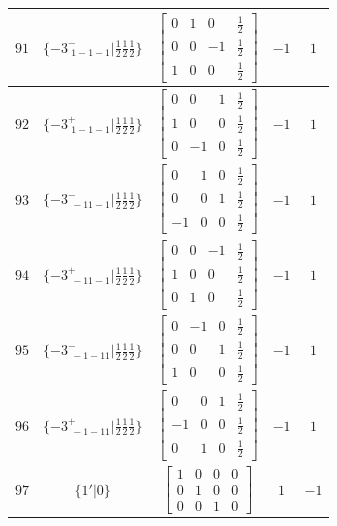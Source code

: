 \documentclass[fleqn,8pt]{jsarticle}
\begin{document}
\begin{longtable}{ccccc}
$ 91 $ & $ \{-3^{-}_{\,\,1-1-1}|\frac{1}{2} \frac{1}{2} \frac{1}{2}\} $ & $ \begin{bmatrix} 0 & 1 & 0 & \frac{1}{2} \\ 0 & 0 & -1 & \frac{1}{2} \\ 1 & 0 & 0 & \frac{1}{2} \end{bmatrix} $ & $ -1 $ & $ 1 $ \\ \hline
$ 92 $ & $ \{-3^{+}_{\,\,1-1-1}|\frac{1}{2} \frac{1}{2} \frac{1}{2}\} $ & $ \begin{bmatrix} 0 & 0 & 1 & \frac{1}{2} \\ 1 & 0 & 0 & \frac{1}{2} \\ 0 & -1 & 0 & \frac{1}{2} \end{bmatrix} $ & $ -1 $ & $ 1 $ \\ \hline
$ 93 $ & $ \{-3^{-}_{\,\,-11-1}|\frac{1}{2} \frac{1}{2} \frac{1}{2}\} $ & $ \begin{bmatrix} 0 & 1 & 0 & \frac{1}{2} \\ 0 & 0 & 1 & \frac{1}{2} \\ -1 & 0 & 0 & \frac{1}{2} \end{bmatrix} $ & $ -1 $ & $ 1 $ \\ \hline
$ 94 $ & $ \{-3^{+}_{\,\,-11-1}|\frac{1}{2} \frac{1}{2} \frac{1}{2}\} $ & $ \begin{bmatrix} 0 & 0 & -1 & \frac{1}{2} \\ 1 & 0 & 0 & \frac{1}{2} \\ 0 & 1 & 0 & \frac{1}{2} \end{bmatrix} $ & $ -1 $ & $ 1 $ \\ \hline
$ 95 $ & $ \{-3^{-}_{\,\,-1-11}|\frac{1}{2} \frac{1}{2} \frac{1}{2}\} $ & $ \begin{bmatrix} 0 & -1 & 0 & \frac{1}{2} \\ 0 & 0 & 1 & \frac{1}{2} \\ 1 & 0 & 0 & \frac{1}{2} \end{bmatrix} $ & $ -1 $ & $ 1 $ \\ \hline
$ 96 $ & $ \{-3^{+}_{\,\,-1-11}|\frac{1}{2} \frac{1}{2} \frac{1}{2}\} $ & $ \begin{bmatrix} 0 & 0 & 1 & \frac{1}{2} \\ -1 & 0 & 0 & \frac{1}{2} \\ 0 & 1 & 0 & \frac{1}{2} \end{bmatrix} $ & $ -1 $ & $ 1 $ \\ \hline
$ 97 $ & $ \{1{}'|0\} $ & $ \begin{bmatrix} 1 & 0 & 0 & 0 \\ 0 & 1 & 0 & 0 \\ 0 & 0 & 1 & 0 \end{bmatrix} $ & $ 1 $ & $ -1 $ \\ \hline

\end{longtable}
\end{document}
